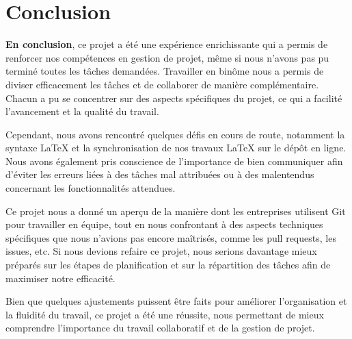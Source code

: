 \section{Conclusion}

\textbf{En conclusion}, ce projet a été une expérience enrichissante qui a permis de renforcer nos compétences en gestion de projet, même si nous n'avons pas pu terminé toutes les tâches demandées. Travailler en binôme nous a permis de diviser efficacement les tâches et de collaborer de manière complémentaire. Chacun a pu se concentrer sur des aspects spécifiques du projet, ce qui a facilité l’avancement et la qualité du travail.
\newline

Cependant, nous avons rencontré quelques défis en cours de route, notamment la syntaxe LaTeX et la synchronisation de nos travaux LaTeX sur le dépôt en ligne. Nous avons également pris conscience de l'importance de bien communiquer afin d’éviter les erreurs liées à des tâches mal attribuées ou à des malentendus concernant les fonctionnalités attendues.
\newline

Ce projet nous a donné un aperçu de la manière dont les entreprises utilisent Git pour travailler en équipe, tout en nous confrontant à des aspects techniques spécifiques que nous n’avions pas encore maîtrisés, comme les pull requests, les issues, etc. Si nous devions refaire ce projet, nous serions davantage mieux préparés sur les étapes de planification et sur la répartition des tâches afin de maximiser notre efficacité.
\newline

Bien que quelques ajustements puissent être faits pour améliorer l’organisation et la fluidité du travail, ce projet a été une réussite, nous permettant de mieux comprendre l’importance du travail collaboratif et de la gestion de projet.